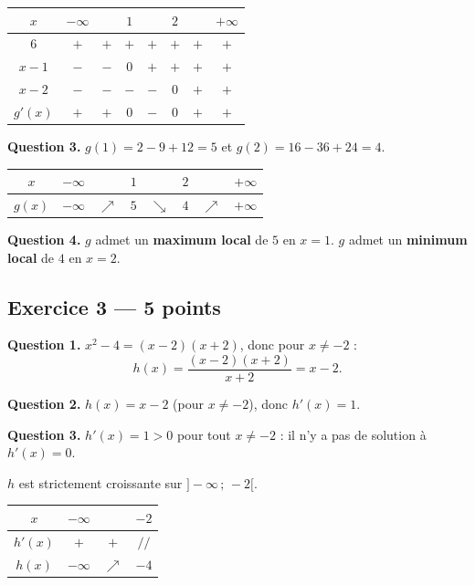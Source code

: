 \begin{center}
\begin{tabular}{|c|ccccccc|}
\hline
$x$ & $-\infty$ & & $1$ & & $2$ & & $+\infty$ \\
\hline
$6$ & $+$ & $+$ & $+$ & $+$ & $+$ & $+$ & $+$ \\
$x-1$ & $-$ & $-$ & $0$ & $+$ & $+$ & $+$ & $+$ \\
$x-2$ & $-$ & $-$ & $-$ & $-$ & $0$ & $+$ & $+$ \\
$g'(x)$ & $+$ & $+$ & $0$ & $-$ & $0$ & $+$ & $+$ \\
\hline
\end{tabular}
\end{center}

\textbf{Question 3.}
$g(1) = 2 - 9 + 12 = 5$ et $g(2) = 16 - 36 + 24 = 4.$

\begin{center}
\begin{tabular}{|c|ccccccc|}
\hline
$x$ & $-\infty$ & & $1$ & & $2$ & & $+\infty$ \\
\hline
$g(x)$ & $-\infty$ & $\nearrow$ & $5$ & $\searrow$ & $4$ & $\nearrow$ & $+\infty$ \\
\hline
\end{tabular}
\end{center}

\textbf{Question 4.}
$g$ admet un \textbf{maximum local} de $5$ en $x = 1$.
$g$ admet un \textbf{minimum local} de $4$ en $x = 2$.

\subsection*{Exercice 3 — 5 points}


\textbf{Question 1.}
$x^2 - 4 = (x-2)(x+2)$, donc pour $x
\neq -2$ :
\[
h(x) = \frac{(x-2)(x+2)}{x+2} = x - 2.
\]

\textbf{Question 2.}
$h(x) = x - 2$ (pour $x
\neq -2$), donc $h'(x) = 1$.

\textbf{Question 3.}
$h'(x) = 1 > 0$ pour tout $x
\neq -2$ : il n'y a pas de solution à $h'(x) = 0$.

$h$ est strictement croissante sur $]-\infty\,;\,-2[$.

\begin{center}
\begin{tabular}{|c|ccc|}
\hline
$x$ & $-\infty$ & & $-2$ \\
\hline
$h'(x)$ & $+$ & $+$ & $/\!/$ \\
\hline
$h(x)$ & $-\infty$ & $\nearrow$ & $-4$ \\
\hline
\end{tabular}
\end{center}

